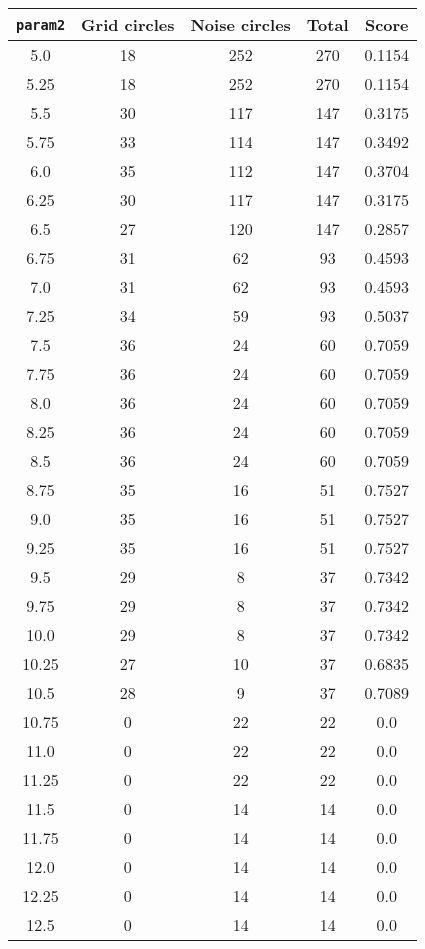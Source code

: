 \documentclass[letterpaper, 12pt]{article}
\begin{document}
\begin{longtable}{|c|c|c|c|c|}
\hline
\textbf{\texttt{param2}} & \textbf{Grid circles} & \textbf{Noise circles} & \textbf{Total} & \textbf{Score} \\
\hline
5.0 & 18 & 252 & 270 & 0.1154 \\
\hline
5.25 & 18 & 252 & 270 & 0.1154 \\
\hline
5.5 & 30 & 117 & 147 & 0.3175 \\
\hline
5.75 & 33 & 114 & 147 & 0.3492 \\
\hline
6.0 & 35 & 112 & 147 & 0.3704 \\
\hline
6.25 & 30 & 117 & 147 & 0.3175 \\
\hline
6.5 & 27 & 120 & 147 & 0.2857 \\
\hline
6.75 & 31 & 62 & 93 & 0.4593 \\
\hline
7.0 & 31 & 62 & 93 & 0.4593 \\
\hline
7.25 & 34 & 59 & 93 & 0.5037 \\
\hline
7.5 & 36 & 24 & 60 & 0.7059 \\
\hline
7.75 & 36 & 24 & 60 & 0.7059 \\
\hline
8.0 & 36 & 24 & 60 & 0.7059 \\
\hline
8.25 & 36 & 24 & 60 & 0.7059 \\
\hline
8.5 & 36 & 24 & 60 & 0.7059 \\
\hline
8.75 & 35 & 16 & 51 & 0.7527 \\
\hline
9.0 & 35 & 16 & 51 & 0.7527 \\
\hline
9.25 & 35 & 16 & 51 & 0.7527 \\
\hline
9.5 & 29 & 8 & 37 & 0.7342 \\
\hline
9.75 & 29 & 8 & 37 & 0.7342 \\
\hline
10.0 & 29 & 8 & 37 & 0.7342 \\
\hline
10.25 & 27 & 10 & 37 & 0.6835 \\
\hline
10.5 & 28 & 9 & 37 & 0.7089 \\
\hline
10.75 & 0 & 22 & 22 & 0.0 \\
\hline
11.0 & 0 & 22 & 22 & 0.0 \\
\hline
11.25 & 0 & 22 & 22 & 0.0 \\
\hline
11.5 & 0 & 14 & 14 & 0.0 \\
\hline
11.75 & 0 & 14 & 14 & 0.0 \\
\hline
12.0 & 0 & 14 & 14 & 0.0 \\
\hline
12.25 & 0 & 14 & 14 & 0.0 \\
\hline
12.5 & 0 & 14 & 14 & 0.0 \\

\end{longtable}
\end{document}

